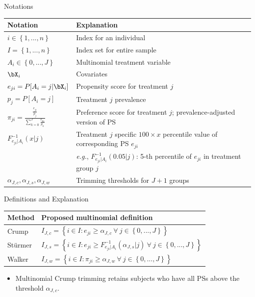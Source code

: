 \documentclass[final]{beamer}
\begin{document}
\begin{frame}[label={sec:org6cddcf1}]{}
\begin{columns}
\begin{column}[t]{0.48\columnwidth}
\begin{block}{Notations}
\small
\begin{center}
\begin{tabular}{ll}
Notation & Explanation\\
\hline
\(i \in \left\{ 1,...,n \right\}\) & Index for an individual\\
\(I = \left\{ 1,...,n \right\}\) & Index set for entire sample\\
\(A_{i} \in \left\{ 0,...,J \right\}\) & Multinomial treatment variable\\
\(\bX_{i}\) & Covariates\\
\(e_{ji} = P[A_{i}=j \vert \bX_{i}]\) & Propensity score for treatment \(j\)\\
\(p_{j} = P[A_{i}=j]\) & Treatment \(j\) prevalence\\
\(\pi_{ji} = \frac{\frac{e_{ji}}{p_{j}}}{\sum^{J}_{k=0} \frac{e_{ki}}{p_{k}}}\) & Preference score for treatment \(j\); prevalence-adjusted version of PS\\
\(F^{-1}_{e_{ji} \vert A_{i}}(x \vert j)\) & Treatment \(j\) specific \(100 \times x\) percentile value of corresponding PS \(e_{ji}\)\\
 & \textit{e.g.}, \(F^{-1}_{e_{ji} \vert A_{i}}(0.05 \vert j)\): 5-th percentile of \(e_{ji}\) in treatment group \(j\)\\
\(\alpha_{J,c},\alpha_{J,s},\alpha_{J,w}\) & Trimming thresholds for \(J+1\) groups\\
\end{tabular}
\end{center}
\end{block}


\begin{block}{Definitions and Explanation}
\large
\begin{center}
\begin{tabular}{ll}
Method & Proposed multinomial definition\\
\hline
Crump & \(I_{J,c} = \left\{ i \in I: e_{ji} \ge \alpha_{J,c} ~\forall~ j \in \left\{ 0,...,J \right\} \right\}\)\\
Stürmer & \(I_{J,s} = \left\{ i \in I: e_{ji} \ge F^{-1}_{e_{ji} \vert A_{i}}(\alpha_{J,s} \vert j) ~\forall~ j \in \left\{ 0,...,J \right\} \right\}\)\\
Walker & \(I_{J,w} = \left\{ i \in I: \pi_{ji} \ge \alpha_{J,w} ~\forall~ j \in \left\{ 0,...,J \right\} \right\}\)\\
\end{tabular}
\end{center}
\small
\begin{itemize}
\item Multinomial Crump trimming retains subjects who have all PSs above the threshold \(\alpha_{J,c}\).


\end{itemize}
\end{block}
\end{column}
\end{columns}
\end{frame}
\end{document}
